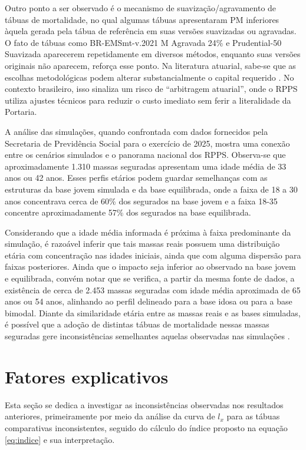 Outro ponto a ser observado é o mecanismo de suavização/agravamento de tábuas de mortalidade, no qual algumas tábuas apresentaram PM inferiores àquela gerada pela tábua de referência em suas versões suavizadas ou agravadas. O fato de tábuas como BR-EMSmt-v.2021 M Agravada 24\% e Prudential-50 Suavizada aparecerem repetidamente em diversos métodos, enquanto suas versões originais não aparecem, reforça esse ponto. Na literatura atuarial, sabe-se que as escolhas metodológicas podem alterar substancialmente o capital requerido \cite{palman2017}. No contexto brasileiro, isso sinaliza um risco de “arbitragem atuarial”, onde o RPPS utiliza ajustes técnicos para reduzir o custo imediato sem ferir a literalidade da Portaria.

A análise das simulações, quando confrontada com dados fornecidos pela Secretaria de Previdência Social para o exercício de 2025, mostra uma conexão entre os cenários simulados e o panorama nacional dos RPPS. Observa-se que aproximadamente 1.310 massas seguradas apresentam uma idade média de 33 anos ou 42 anos. Esses perfis etários podem guardar semelhanças com as estruturas da base jovem simulada e da base equilibrada, onde a faixa de 18 a 30 anos concentrava cerca de 60\% dos segurados na base jovem e a faixa 18-35 concentre aproximadamente 57\% dos segurados na base equilibrada. 

Considerando que a idade média informada é próxima à faixa predominante da simulação, é razoável inferir que tais massas reais possuem uma distribuição etária com concentração nas idades iniciais, ainda que com alguma dispersão para faixas posteriores. Ainda que o impacto seja inferior ao observado na base jovem e equilibrada, convém notar que se verifica, a partir da mesma fonte de dados, a existência de cerca de 2.453 massas seguradas com idade média aproximada de 65 anos ou 54 anos, alinhando ao perfil delineado para a base idosa ou para a base bimodal. Diante da similaridade etária entre as massas reais e as bases simuladas, é possível que a adoção de distintas tábuas de mortalidade nessas massas seguradas gere inconsistências semelhantes aquelas observadas nas simulações \cite{brasil_draa_2026}.

\section{\textbf{Fatores explicativos}}

Esta seção se dedica a investigar as inconsistências observadas nos resultados anteriores, primeiramente por meio da análise da curva de $l_x$ para as tábuas comparativas inconsistentes, seguido do cálculo do índice proposto na equação \ref{eq:indice} e sua interpretação.

